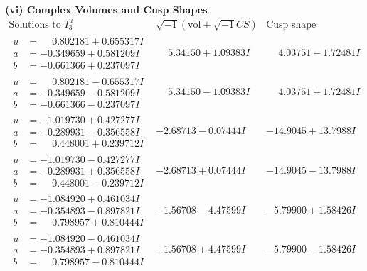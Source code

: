 \documentclass[1p]{elsarticle_modified}
\theoremstyle{definition}
\newcommand{\I}{\sqrt{-1}}
\begin{document}
\newpage\flushleft \textbf{(vi) Complex Volumes and Cusp Shapes}
$$\begin{array}{c|c|c}  
\text{Solutions to }I^u_{3}& \I (\text{vol} + \sqrt{-1}CS) & \text{Cusp shape}\\
 \hline 
\begin{aligned}
u &= \phantom{-}0.802181 + 0.655317 I \\
a &= -0.349659 + 0.581209 I \\
b &= -0.661366 + 0.237097 I\end{aligned}
 & \phantom{-}5.34150 + 1.09383 I & \phantom{-}4.03751 - 1.72481 I \\ \hline\begin{aligned}
u &= \phantom{-}0.802181 - 0.655317 I \\
a &= -0.349659 - 0.581209 I \\
b &= -0.661366 - 0.237097 I\end{aligned}
 & \phantom{-}5.34150 - 1.09383 I & \phantom{-}4.03751 + 1.72481 I \\ \hline\begin{aligned}
u &= -1.019730 + 0.427277 I \\
a &= -0.289931 - 0.356558 I \\
b &= \phantom{-}0.448001 + 0.239712 I\end{aligned}
 & -2.68713 - 0.07444 I & -14.9045 + 13.7988 I \\ \hline\begin{aligned}
u &= -1.019730 - 0.427277 I \\
a &= -0.289931 + 0.356558 I \\
b &= \phantom{-}0.448001 - 0.239712 I\end{aligned}
 & -2.68713 + 0.07444 I & -14.9045 - 13.7988 I \\ \hline\begin{aligned}
u &= -1.084920 + 0.461034 I \\
a &= -0.354893 - 0.897821 I \\
b &= \phantom{-}0.798957 + 0.810444 I\end{aligned}
 & -1.56708 - 4.47599 I & -5.79900 + 1.58426 I \\ \hline\begin{aligned}
u &= -1.084920 - 0.461034 I \\
a &= -0.354893 + 0.897821 I \\
b &= \phantom{-}0.798957 - 0.810444 I\end{aligned}
 & -1.56708 + 4.47599 I & -5.79900 - 1.58426 I \\ \hline\begin{aligned}

\end{aligned}
\end{array}$$
\end{document}
